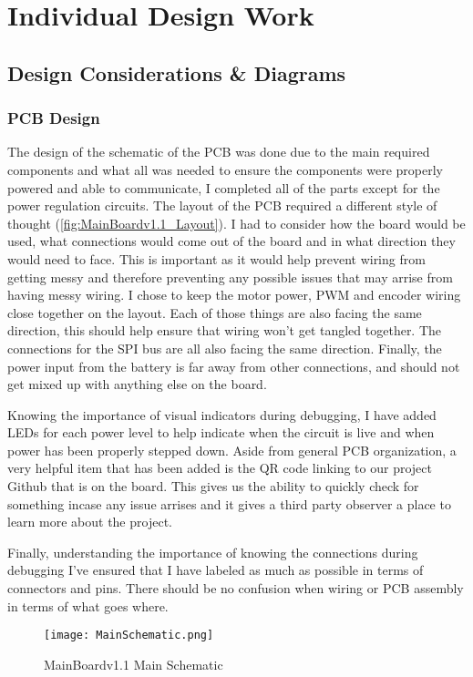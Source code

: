 \documentclass{report}
\begin{document}
    \chapter{Individual Design Work}
    \section{Design Considerations \& Diagrams}

    \subsection{PCB Design}
    The design of the schematic of the PCB was done due to the main required components and what all was needed to ensure the components were properly powered and able to communicate, I completed all of the parts except for the power regulation circuits. The layout of the PCB required a different style of thought (\ref{fig:MainBoardv1.1_Layout}). I had to consider how the board would be used, what connections would come out of the board and in what direction they would need to face. This is important as it would help prevent wiring from getting messy and therefore preventing any possible issues that may arrise from having messy wiring. I chose to keep the motor power, PWM and encoder wiring close together on the layout. Each of those things are also facing the same direction, this should help ensure that wiring won't get tangled together. The connections for the SPI bus are all also facing the same direction. Finally, the power input from the battery is far away from other connections, and should not get mixed up with anything else on the board.

    Knowing the importance of visual indicators during debugging, I have added LEDs for each power level to help indicate when the circuit is live and when power has been properly stepped down. Aside from general PCB organization, a very helpful item that has been added is the QR code linking to our project Github that is on the board. This gives us the ability to quickly check for something incase any issue arrises and it gives a third party observer a place to learn more about the project.

    Finally, understanding the importance of knowing the connections during debugging I've ensured that I have labeled as much as possible in terms of connectors and pins. There should be no confusion when wiring or PCB assembly in terms of what goes where.

    \begin{figure}[ht!]
        \centering
        \texttt{[image: MainSchematic.png]}
        \caption{MainBoardv1.1 Main Schematic}
        \label{fig:MainSchematic}
    \end{figure}
\end{document}
